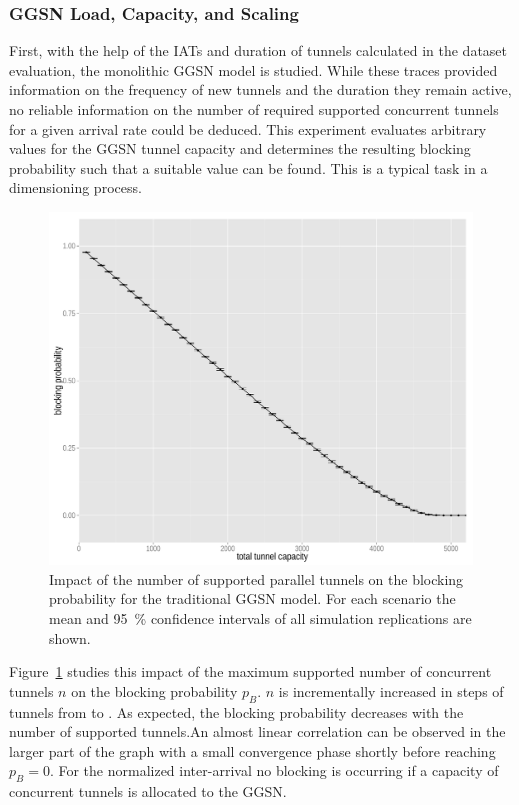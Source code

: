 \subsubsection{GGSN Load, Capacity, and Scaling}

First, with the help of the \glspl{IAT} and duration of tunnels calculated in the dataset evaluation, the monolithic \gls{GGSN} model is studied. While these traces provided information on the frequency of new tunnels and the duration they remain active, no reliable information on the number of required supported concurrent tunnels for a given arrival rate could be deduced. 
This experiment evaluates arbitrary values for the \gls{GGSN} tunnel capacity and determines the resulting blocking probability such that a suitable value can be found. This is a typical task in a dimensioning process.

\begin{figure}[htb]
	\centering
	\includegraphics[width=1.0\textwidth]{images/R-monolithic-blocking.pdf}
	\caption{Impact of the number of supported parallel tunnels on the blocking probability for the traditional \gls{GGSN} model. For each scenario the mean and \SI{95}{\percent} confidence intervals of all simulation replications are shown.}
\label{c4:fig:traditional_blocking}
\end{figure}

Figure~\ref{c4:fig:traditional_blocking} studies this impact of the maximum supported number of concurrent tunnels $n$ on the blocking probability $p_B$. $n$ is incrementally increased in steps of  tunnels from  to . As expected, the blocking probability decreases with the number of supported tunnels.An almost linear correlation can be observed in the larger part of the graph with a small convergence phase shortly before reaching $p_B=0$. For the normalized inter-arrival no blocking is occurring if a capacity of  concurrent tunnels is allocated to the \gls{GGSN}.

